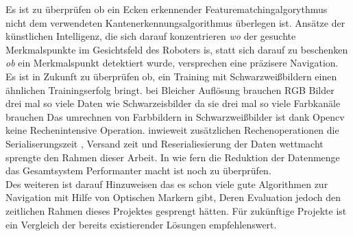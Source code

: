 \documentclass[conference]{IEEEtran}
\begin{document}
Es ist zu überprüfen ob ein Ecken erkennender Featurematchingalgorythmus nicht dem verwendeten  Kantenerkennungsalgorithmus überlegen ist. Ansätze der künstlichen Intelligenz, die sich darauf konzentrieren \textit{wo} der gesuchte Merkmalspunkte  im Gesichtsfeld des Roboters is, statt sich darauf zu beschenken \textit{ob} ein Merkmalspunkt detektiert wurde, versprechen eine präzisere Navigation. \\
Es ist in Zukunft zu überprüfen ob, ein Training mit Schwarzweißbildern einen ähnlichen Trainingserfolg bringt.  bei Bleicher Auflösung brauchen RGB Bilder drei mal so viele Daten wie Schwarzeisbilder da sie drei mal so viele Farbkanäle brauchen Das umrechnen von Farbbildern in Schwarzweißbilder ist dank Opencv keine Rechenintensive Operation. inwieweit  zusätzlichen Rechenoperationen die Serialiserungszeit , Versand zeit und Reserialiesierung der Daten wettmacht sprengte den Rahmen dieser Arbeit. In wie fern die Reduktion der Datenmenge das Gesamtsystem Performanter macht ist noch zu überprüfen.
\\
Des weiteren ist darauf Hinzuweisen das es schon viele gute Algorithmen zur Navigation mit Hilfe von Optischen Markern gibt, Deren Evaluation jedoch den zeitlichen Rahmen dieses Projektes gesprengt hätten. Für zukünftige Projekte ist ein Vergleich der bereits existierender Lösungen empfehlenswert.

\end{document}
